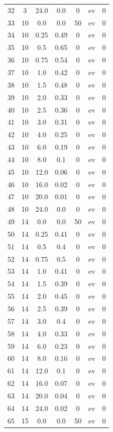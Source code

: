 \documentclass[12pt,a4paper]{article}
\begin{document}
\begin{tabular}{r|cccccc}
	32 & 3 & 24.0 & 0.0 & 0 & ev & 0 \\
	33 & 10 & 0.0 & 0.0 & 50 & ev & 0 \\
	34 & 10 & 0.25 & 0.49 & 0 & ev & 0 \\
	35 & 10 & 0.5 & 0.65 & 0 & ev & 0 \\
	36 & 10 & 0.75 & 0.54 & 0 & ev & 0 \\
	37 & 10 & 1.0 & 0.42 & 0 & ev & 0 \\
	38 & 10 & 1.5 & 0.48 & 0 & ev & 0 \\
	39 & 10 & 2.0 & 0.33 & 0 & ev & 0 \\
	40 & 10 & 2.5 & 0.36 & 0 & ev & 0 \\
	41 & 10 & 3.0 & 0.31 & 0 & ev & 0 \\
	42 & 10 & 4.0 & 0.25 & 0 & ev & 0 \\
	43 & 10 & 6.0 & 0.19 & 0 & ev & 0 \\
	44 & 10 & 8.0 & 0.1 & 0 & ev & 0 \\
	45 & 10 & 12.0 & 0.06 & 0 & ev & 0 \\
	46 & 10 & 16.0 & 0.02 & 0 & ev & 0 \\
	47 & 10 & 20.0 & 0.01 & 0 & ev & 0 \\
	48 & 10 & 24.0 & 0.0 & 0 & ev & 0 \\
	49 & 14 & 0.0 & 0.0 & 50 & ev & 0 \\
	50 & 14 & 0.25 & 0.41 & 0 & ev & 0 \\
	51 & 14 & 0.5 & 0.4 & 0 & ev & 0 \\
	52 & 14 & 0.75 & 0.5 & 0 & ev & 0 \\
	53 & 14 & 1.0 & 0.41 & 0 & ev & 0 \\
	54 & 14 & 1.5 & 0.39 & 0 & ev & 0 \\
	55 & 14 & 2.0 & 0.45 & 0 & ev & 0 \\
	56 & 14 & 2.5 & 0.39 & 0 & ev & 0 \\
	57 & 14 & 3.0 & 0.4 & 0 & ev & 0 \\
	58 & 14 & 4.0 & 0.33 & 0 & ev & 0 \\
	59 & 14 & 6.0 & 0.23 & 0 & ev & 0 \\
	60 & 14 & 8.0 & 0.16 & 0 & ev & 0 \\
	61 & 14 & 12.0 & 0.1 & 0 & ev & 0 \\
	62 & 14 & 16.0 & 0.07 & 0 & ev & 0 \\
	63 & 14 & 20.0 & 0.04 & 0 & ev & 0 \\
	64 & 14 & 24.0 & 0.02 & 0 & ev & 0 \\
	65 & 15 & 0.0 & 0.0 & 50 & ev & 0 \\

\end{tabular}
\end{document}
